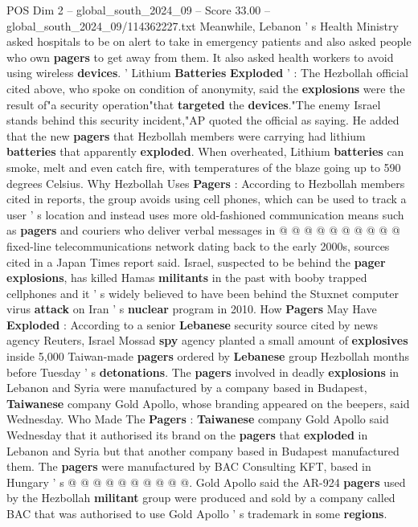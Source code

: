 \begin{textsample}{POS Dim 2 – global\_south\_2024\_09 – Score 33.00 – global\_south\_2024\_09/114362227.txt}
Meanwhile, Lebanon ' s Health Ministry asked hospitals to be on alert to take in emergency patients and also asked people who own \textbf{pagers} to get away from them.
It also asked health workers to avoid using wireless \textbf{devices}. ' Lithium \textbf{Batteries} \textbf{Exploded} ' : The Hezbollah official cited above, who spoke on condition of anonymity, said the \textbf{explosions} were the result of"a security operation"that \textbf{targeted} the \textbf{devices}."The enemy Israel stands behind this security incident,"AP quoted the official as saying.
He added that the new \textbf{pagers} that Hezbollah members were carrying had lithium \textbf{batteries} that apparently \textbf{exploded}.
When overheated, Lithium \textbf{batteries} can smoke, melt and even catch fire, with temperatures of the blaze going up to 590 degrees Celsius.
Why Hezbollah Uses \textbf{Pagers} : According to Hezbollah members cited in reports, the group avoids using cell phones, which can be used to track a user ' s location and instead uses more old-fashioned communication means such as \textbf{pagers} and couriers who deliver verbal messages in @ @ @ @ @ @ @ @ @ @ fixed-line telecommunications network dating back to the early 2000s, sources cited in a Japan Times report said.
Israel, suspected to be behind the \textbf{pager} \textbf{explosions}, has killed Hamas \textbf{militants} in the past with booby trapped cellphones and it ' s widely believed to have been behind the Stuxnet computer virus \textbf{attack} on Iran ' s \textbf{nuclear} program in 2010.
How \textbf{Pagers} May Have \textbf{Exploded} : According to a senior \textbf{Lebanese} security source cited by news agency Reuters, Israel Mossad \textbf{spy} agency planted a small amount of \textbf{explosives} inside 5,000 Taiwan-made \textbf{pagers} ordered by \textbf{Lebanese} group Hezbollah months before Tuesday ' s \textbf{detonations}.
The \textbf{pagers} involved in deadly \textbf{explosions} in Lebanon and Syria were manufactured by a company based in Budapest, \textbf{Taiwanese} company Gold Apollo, whose branding appeared on the beepers, said Wednesday.
Who Made The \textbf{Pagers} : \textbf{Taiwanese} company Gold Apollo said Wednesday that it authorised its brand on the \textbf{pagers} that \textbf{exploded} in Lebanon and Syria but that another company based in Budapest manufactured them.
The \textbf{pagers} were manufactured by BAC Consulting KFT, based in Hungary ' s @ @ @ @ @ @ @ @ @ @.
Gold Apollo said the AR-924 \textbf{pagers} used by the Hezbollah \textbf{militant} group were produced and sold by a company called BAC that was authorised to use Gold Apollo ' s trademark in some \textbf{regions}.

\end{textsample}
